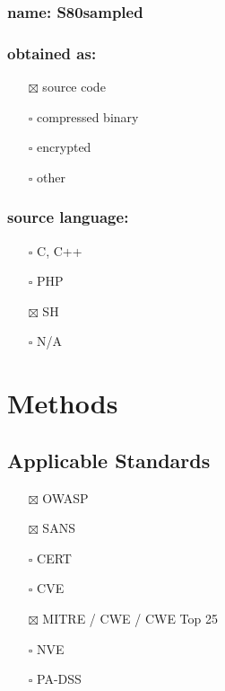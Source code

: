 \documentclass[11pt]{article}
\begin{document}
\subsubsection{name: S80sampled}
\label{sec:orgfbd7561}
\subsubsection{obtained as:}
\label{sec:orga3b9d19}
\begin{itemize}
\item[{$\boxtimes$}] source code
\item[{$\square$}] compressed binary
\item[{$\square$}] encrypted
\item[{$\square$}] other
\end{itemize}
\subsubsection{source language:}
\label{sec:org8d64aaa}
\begin{itemize}
\item[{$\square$}] C, C++
\item[{$\square$}] PHP
\item[{$\boxtimes$}] SH
\item[{$\square$}] N/A
\end{itemize}
\section{Methods}
\label{sec:org71c7d50}
\subsection{Applicable Standards}
\label{sec:orgd6e7e1f}
\begin{itemize}
\item[{$\boxtimes$}] OWASP
\item[{$\boxtimes$}] SANS
\item[{$\square$}] CERT
\item[{$\square$}] CVE
\item[{$\boxtimes$}] MITRE / CWE / CWE Top 25
\item[{$\square$}] NVE
\item[{$\square$}] PA-DSS
\end{itemize}
\end{document}
